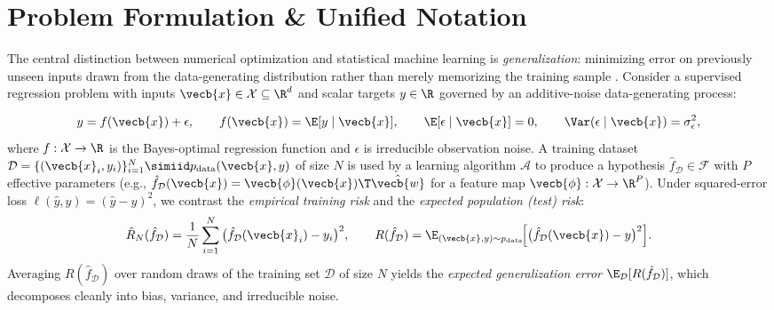 \documentclass[../../../../master.tex]{subfiles}
\begin{document}

\section{Problem Formulation \& Unified Notation}
\label{sec:biasvar:formulation}

\begingroup\sloppy
The central distinction between numerical optimization and statistical machine learning is \emph{generalization}: minimizing error on previously unseen inputs drawn from the data-generating distribution rather than merely memorizing the training sample . Consider a supervised regression problem with inputs $\vecb{x} \in \mathcal{X} \subseteq \R^d$ and scalar targets $y \in \R$ governed by an additive-noise data-generating process:
\par\endgroup
\begin{equation}
  y = f(\vecb{x}) + \epsilon,
  \qquad
  f(\vecb{x}) = \E[y \mid \vecb{x}],
  \qquad
  \E[\epsilon \mid \vecb{x}] = 0,
  \qquad
  \Var(\epsilon \mid \vecb{x}) = \sigma_\epsilon^2,
  \label{eq:biasvar:dgp}
\end{equation}
where $f : \mathcal{X} \to \R$ is the Bayes-optimal regression function and $\epsilon$ is irreducible observation noise. A training dataset $\mathcal{D} = \{(\vecb{x}_i, y_i)\}_{i=1}^N \simiid p_{\mathrm{data}}(\vecb{x}, y)$ of size $N$ is used by a learning algorithm $\mathcal{A}$ to produce a hypothesis $\hat{f}_{\mathcal{D}} \in \mathcal{F}$ with $P$ effective parameters (e.g., $\hat{f}_{\mathcal{D}}(\vecb{x}) = \vecb{\phi}(\vecb{x})\T \hat{\vecb{w}}$ for a feature map $\vecb{\phi} : \mathcal{X} \to \R^P$). Under squared-error loss $\ell(\hat{y}, y) = (\hat{y} - y)^2$, we contrast the \emph{empirical training risk} and the \emph{expected population (test) risk}:
\begin{equation}
  \hat{R}_N(\hat{f}_{\mathcal{D}}) = \frac{1}{N} \sum_{i=1}^N \big(\hat{f}_{\mathcal{D}}(\vecb{x}_i) - y_i\big)^2,
  \qquad
  R(\hat{f}_{\mathcal{D}}) = \E_{(\vecb{x}, y) \sim p_{\mathrm{data}}}\!\Big[\big(\hat{f}_{\mathcal{D}}(\vecb{x}) - y\big)^2\Big].
  \label{eq:biasvar:risks}
\end{equation}
Averaging $R(\hat{f}_{\mathcal{D}})$ over random draws of the training set $\mathcal{D}$ of size $N$ yields the \emph{expected generalization error} $\E_{\mathcal{D}}[R(\hat{f}_{\mathcal{D}})]$, which decomposes cleanly into bias, variance, and irreducible noise.
\end{document}
